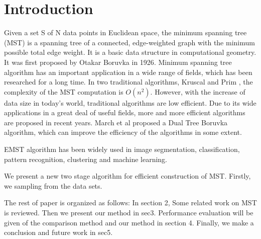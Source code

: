 \section{Introduction}
Given a set S of N data points in Euclidean space, the minimum spanning tree (MST) is a spanning tree of a connected, edge-weighted graph with the minimum possible total edge weight. It is a basic data structure in computational geometry. It was first proposed by Otakar Boruvka in 1926\cite{zbMATH02560699}. Minimum spanning tree algorithm has an important application in a wide range of fields, which has been researched for a long time. In two traditional algorithms, Kruscal\cite{Kruskal1956On} and Prim \cite{Prim2013Shortest}, the complexity of the MST computation is $O(n^2)$. However, with the increase of data size in today's world, traditional algorithms are low efficient. Due to its wide applications in a great deal of useful fields, more and more efficient algorithms are proposed in recent years. March et al proposed a Dual Tree Boruvka algorithm, which can improve the efficiency of the algorithms in some extent.

EMST algorithm has been widely used in image segmentation\cite{An2000A, Xu19972D}, classification\cite{Juszczak2009Minimum}, pattern recognition\cite{Zhong2010A}, clustering\cite{Zahn1971Graph, Xu2002Clustering} and machine learning.

We present a new two stage algorithm for efficient construction of MST. Firstly, we sampling from the data sets.
 
The rest of paper is organized as follows: In section 2, Some related work on MST is reviewed. Then we present our method in sec3. Performance evaluation will be given of the comparison method and our method in section 4. Finally, we make a conclusion and future work in sec5. 
 
